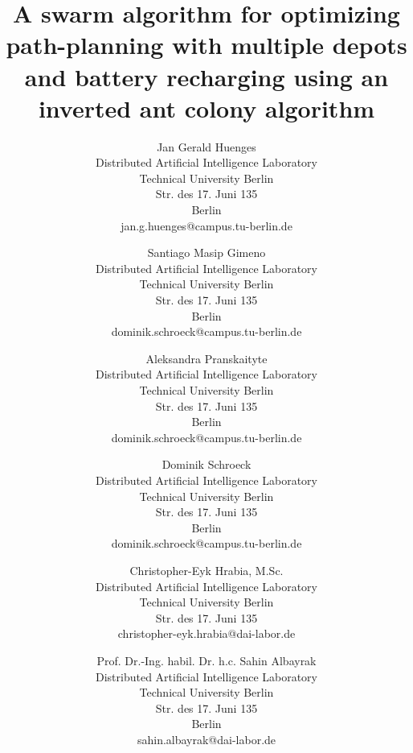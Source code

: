 \documentclass{scspaperproc}
\theoremstyle{scsthe}
\begin{document}
\title{A swarm algorithm for optimizing path-planning with multiple depots and battery recharging using an inverted ant colony algorithm}

\author{Jan Gerald Huenges \\[12pt]
Distributed Artificial Intelligence Laboratory \\
Technical University Berlin \\
Str. des 17. Juni 135 \\
Berlin \\
jan.g.huenges@campus.tu-berlin.de \\
\and
Santiago Masip Gimeno \\ [12pt]
Distributed Artificial Intelligence Laboratory \\
Technical University Berlin \\
Str. des 17. Juni 135 \\
Berlin \\
dominik.schroeck@campus.tu-berlin.de \\
\and
Aleksandra Pranskaityte \\ [12pt]
Distributed Artificial Intelligence Laboratory \\
Technical University Berlin \\
Str. des 17. Juni 135 \\
Berlin \\
dominik.schroeck@campus.tu-berlin.de \\
\and
Dominik Schroeck \\ [12pt]
Distributed Artificial Intelligence Laboratory \\
Technical University Berlin \\
Str. des 17. Juni 135 \\
Berlin \\
dominik.schroeck@campus.tu-berlin.de \\
\and
Christopher-Eyk Hrabia, M.Sc. \\ [12pt]
Distributed Artificial Intelligence Laboratory \\
Technical University Berlin \\
Str. des 17. Juni 135 \\
christopher-eyk.hrabia@dai-labor.de \\
\and
Prof. Dr.-Ing. habil. Dr. h.c. Sahin Albayrak\\[12pt]
Distributed Artificial Intelligence Laboratory \\
Technical University Berlin \\
Str. des 17. Juni 135 \\
Berlin \\
sahin.albayrak@dai-labor.de
}
\maketitle
\end{document}
